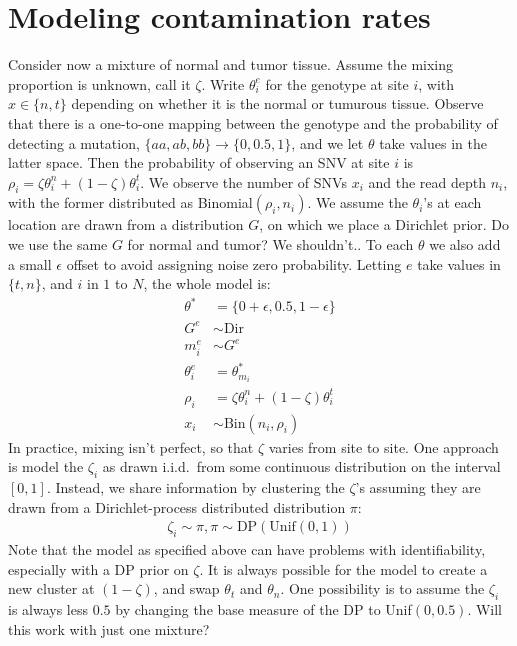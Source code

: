 \documentclass[10pt]{article}
\begin{document}
\section{Modeling contamination rates}
 Consider now a mixture of normal and tumor tissue. Assume the mixing proportion is unknown, call it $\zeta$. Write $\theta^e_i$ for the
 genotype at site $i$, with $x \in \{n,t\}$ depending on whether it is the normal or tumurous tissue. Observe that there is a one-to-one
 mapping between the genotype and the probability of detecting a mutation, $\{aa,ab,bb\} \rightarrow \{0,0.5,1\}$, and we let $\theta$ take
 values in the latter space. Then the probability of observing an SNV at site $i$ is $\rho_i =  \zeta \theta^n_i + (1-\zeta) \theta^t_i$.
 We observe the number of SNVs $x_i$ and the read depth $n_i$, with the former distributed as Binomial$(\rho_i, n_i)$. We assume the 
 $\theta_i$'s at each location are drawn from a distribution $G$, on which we place a Dirichlet prior.
 {\color{red} Do we use the same $G$ for normal and tumor? We shouldn't.}. To each $\theta$ we also add a small $\epsilon$ offset to
 avoid assigning noise zero probability. Letting $e$ take values in $\{t,n\}$, and $i$ in $1$ to $N$, the whole model is:
 \begin{align}
   \theta^* &= \{0+\epsilon, 0.5, 1-\epsilon\} \\
   G^e &\sim \text{Dir} \\ 
   m^e_i & \sim G^e \\
   \theta^e_i &= \theta^*_{m_i} \\
   \rho_i &= \zeta \theta^n_i + (1-\zeta) \theta^t_i \\
   x_i &\sim \text{Bin}(n_i,\rho_i)
 \end{align}
 In practice, mixing isn't perfect, so that $\zeta$ varies from site to site. One approach is model the $\zeta_i$ as drawn i.i.d.\ from some
 continuous distribution on the interval $[0,1]$. Instead, we share information by clustering the $\zeta$'s assuming they are drawn from a 
 Dirichlet-process distributed distribution $\pi$:
 \begin{align}
   \zeta_i \sim \pi, \pi \sim \text{DP}(\text{Unif}(0,1))
 \end{align}
Note that the model as specified above can have problems with identifiability, especially with a DP prior on $\zeta$. It is always possible for
the model to create a new cluster at $(1-\zeta)$, and swap $\theta_t$ and $\theta_n$. One possibility is to assume the $\zeta_i$ is always less
$0.5$ by changing the base measure of the DP to Unif$(0,0.5)$. {\color{red} Will this work with just one mixture?}
\end{document}
